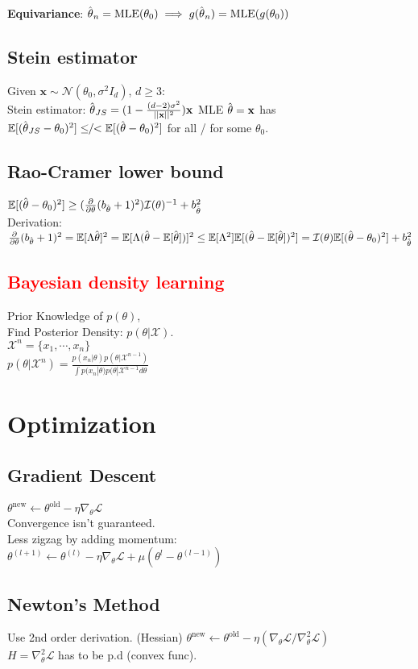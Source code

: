 \textbf{Equivariance}:
$\hat{\kern0pt \theta}_n = \textrm{MLE}(\theta_0) \implies g(\hat{\kern0pt \theta}_n) = \textrm{MLE}(g(\theta_0))$


\subsection*{Stein estimator}
Given $\mathbf{x} \sim \mathcal{N}(\theta_0, \sigma^2I_d)$, $d\geq3$:\\
Stein estimator: $\hat{\kern0pt \theta}_{JS} = (1-\frac{(d-2)\sigma^2}{||\mathbf{x}||^2})\mathbf{x}$
MLE $\hat{\kern0pt \theta} = \mathbf{x}$ has $\mathbb{E}[(\hat{\kern0pt \theta}_{JS} - \theta_0)^2] \leq\!\!/\!\!< \mathbb{E}[(\hat{\kern0pt \theta} - \theta_0)^2]$ for all / for some $\theta_0$.

% 
% 
\subsection*{Rao-Cramer lower bound}    
$\mathbb{E}[(\hat{\kern0pt \theta} - \theta_0)^2] \geq (\frac{\partial}{\partial\theta}(b_{\hat{\kern0pt \theta}}+1)^2)\mathcal{I}(\theta)^{-1} + b_{\hat{\kern0pt \theta}}^2$\\
Derivation: 
$\frac{\partial}{\partial\theta}(b_{\hat{\kern0pt \theta}}+1)^2 = 
 \mathbb{E}[\Lambda\hat{\kern0pt \theta}]^2 = \mathbb{E}[\Lambda(\hat{\kern0pt \theta} - \mathbb{E}[\hat{\kern0pt \theta}])]^2 \leq \mathbb{E}[\Lambda^2]\mathbb{E}[(\hat{\kern0pt \theta}-\mathbb{E}[\hat{\kern0pt \theta}])^2] = \mathcal{I}(\theta)\mathbb{E}[(\hat{\kern0pt \theta} - \theta_0)^2] + b_{\hat{\kern0pt \theta}}^2
$

\subsection*{\textcolor{red}{Bayesian density learning}}
Prior Knowledge of $p(\theta)$,\\
Find Posterior Density: $p(\theta|\mathcal{X})$.\\
$\mathcal{X}^n=\{x_1, \cdots, x_n\}$\\
$p(\theta|\mathcal{X}^n)=\frac{p(x_n|\theta)p(\theta|\mathcal{X}^{n-1})}{\int p(x_n|\theta)p(\theta|\mathcal{X}^{n-1} d\theta}$

\section*{Optimization}
\subsection*{Gradient Descent}
$\theta^{\mathrm{new}}\leftarrow\theta^{\mathrm{old}}-\eta\nabla_{\theta}\mathcal{L}$\\
Convergence isn't guaranteed.\\
Less zigzag by adding momentum: \\$\theta^{(l+1)}\leftarrow\theta^{(l)}-\eta\nabla_{\theta}\mathcal{L}+\mu(\theta^{l}-\theta^{(l-1)})$

\subsection*{Newton's Method}
Use 2nd order derivation. (Hessian)
$\theta^{\mathrm{new}}\leftarrow\theta^{\mathrm{old}}-\eta(\nabla_{\theta}\mathcal{L}/\nabla^2_{\theta}\mathcal{L})$\\
$H=\nabla^2_{\theta}\mathcal{L}$ has to be p.d (convex func).
